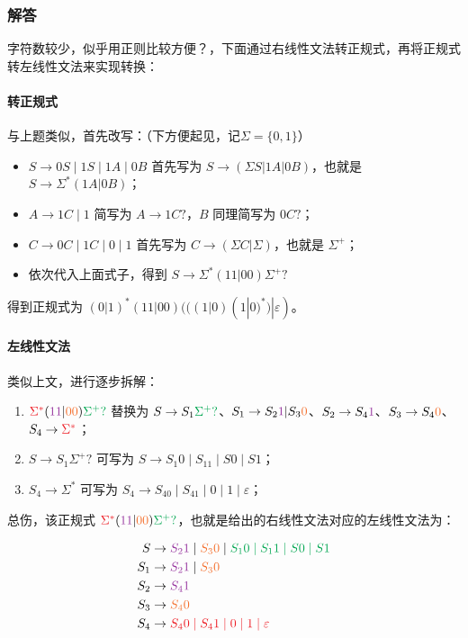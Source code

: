 \subsubsection{解答}

字符数较少，似乎用正则比较方便？，下面通过右线性文法转正规式，再将正规式转左线性文法来实现转换：

\paragraph{转正规式} 与上题类似，首先改写：（下方便起见，记$\Sigma=\{0,1\}$）

\begin{itemize}
    \item $S\rightarrow 0S\;|\;1S\;|\;1A\;|\;0B$ 首先写为 $S\rightarrow (\Sigma S|1A|0B)$，也就是 $S\rightarrow \Sigma^*(1A|0B)$；
    \item $A\rightarrow 1C\;|\;1$ 简写为 $A\rightarrow 1C?$，$B$ 同理简写为 $0C?$；
    \item $C\rightarrow 0C\;|\;1C\;|\;0\;|\;1$ 首先写为 $C\rightarrow (\Sigma C|\Sigma)$，也就是 $\Sigma^+$；
    \item 依次代入上面式子，得到 $S\rightarrow \Sigma^*(11|00)\Sigma^+?$
\end{itemize}

得到正规式为 $(0|1)^*(11|00)(((1|0)(1|0)^*)|\varepsilon)$。

\paragraph{左线性文法} 类似上文，进行逐步拆解：

\begin{enumerate}
    \item ${\color{Red} \Sigma^*} ({\color{Purple} 11} |{\color{Orange} 00} ){\color{Green} \Sigma^+ ?} $ 替换为 $S\rightarrow S_1 {\color{Green} \Sigma^+ ?}$、$S_1\rightarrow S_2{\color{Purple} 1}|S_3{\color{Orange} 0}$、$S_2\rightarrow S_4{\color{Purple} 1}$、$S_3\rightarrow S_4{\color{Orange} 0}$、$S_4\rightarrow {\color{Red} \Sigma^*}$；
    \item $S\rightarrow S_1 \Sigma^+?$ 可写为 $S\rightarrow S_1 0\;|\;S_11\;|\;S0\;|\;S1$；
    \item $S_4\rightarrow \Sigma^*$ 可写为 $S_4\rightarrow S_40\;|\;S_41\;|\;0\;|\;1\;|\;\varepsilon$；
\end{enumerate}

总伤，该正规式 ${\color{Red} \Sigma^*} ({\color{Purple} 11} |{\color{Orange} 00} ){\color{Green} \Sigma^+ ?} $，也就是给出的右线性文法对应的左线性文法为：

\begin{align*}
    S&\rightarrow {\color{Purple} S_21} \;|\;{\color{Orange} S_30} \;|\;{\color{Green} S_1 0\;|\;S_11\;|\;S0\;|\;S1} \\
    S_1&\rightarrow {\color{Purple} S_21} \;|\;{\color{Orange} S_30} \\
    S_2&\rightarrow {\color{Purple} S_41} \\
    S_3&\rightarrow {\color{Orange} S_40} \\
    S_4&\rightarrow {\color{Red} S_40\;|\;S_41\;|\;0\;|\;1\;|\;\varepsilon} 
\end{align*}
